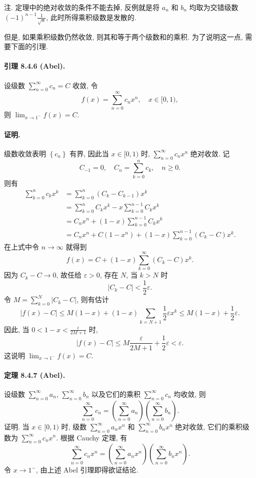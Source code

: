 注. 定理中的绝对收敛的条件不能去掉, 反例就是将 $a_{n}$ 和 $b_{n}$ 均取为交错级数 $(-1)^{n-1}\frac{1}{\sqrt{n}}$,
此时所得乘积级数是发散的. 

但是, 如果乘积级数仍然收敛, 则其和等于两个级数和的乘积. 为了说明这一点, 需要下面的引理.

\paragraph{引理 8.4.6 (Abel). }

设级数 $\sum_{n=0}^{\infty}c_{n}=C$ 收敛, 令 
\[
f(x)=\sum_{n=0}^{\infty}c_{n}x^{n},\quad x\in[0,1),
\]
则 $\lim_{x\rightarrow1^{-}}f(x)=C$.

\paragraph{证明. }

级数收敛表明 $\left\{ c_{n}\right\} $ 有界, 因此当 $x\in[0,1)$ 时, $\sum_{n=0}^{\infty}c_{n}x^{n}$
绝对收敛. 记 
\[
C_{-1}=0,\quad C_{n}=\sum_{k=0}^{n}c_{k},\quad n\geqslant0.
\]
则有 
\[
\begin{aligned}\sum_{k=0}^{n}c_{k}x^{k} & =\sum_{k=0}^{n}\left(C_{k}-C_{k-1}\right)x^{k}\\
	& =\sum_{k=0}^{n}C_{k}x^{k}-x\sum_{k=0}^{n-1}C_{k}x^{k}\\
	& =C_{n}x^{n}+(1-x)\sum_{k=0}^{n-1}C_{k}x^{k}\\
	& =C_{n}x^{n}+C\left(1-x^{n}\right)+(1-x)\sum_{k=0}^{n-1}\left(C_{k}-C\right)x^{k}.
\end{aligned}
\]
在上式中令 $n\rightarrow\infty$ 就得到 
\[
f(x)=C+(1-x)\sum_{k=0}^{\infty}\left(C_{k}-C\right)x^{k}.
\]
因为 $C_{k}-C\rightarrow0$, 故任给 $\varepsilon>0$, 存在 $N$, 当 $k>N$
时 
\[
\left|C_{k}-C\right|<\frac{1}{2}\varepsilon.
\]
令 $M=\sum_{k=0}^{N}\left|C_{k}-C\right|$, 则有估计 
\[
|f(x)-C|\leqslant M(1-x)+(1-x)\sum_{k=N+1}\frac{1}{2}\varepsilon x^{k}\leqslant M(1-x)+\frac{1}{2}\varepsilon.
\]
因此, 当 $0<1-x<\frac{\varepsilon}{2M+1}$ 时, 
\[
|f(x)-C|\leqslant M\frac{\varepsilon}{2M+1}+\frac{1}{2}\varepsilon<\varepsilon.
\]
这说明 $\lim_{x\rightarrow1^{-}}f(x)=C$.

\paragraph{定理 8.4.7 (Abel). }

设级数 $\sum_{n=0}^{\infty}a_{n}$, $\sum_{n=0}^{\infty}b_{n}$ 以及它们的乘积
$\sum_{n=0}^{\infty}c_{n}$ 均收敛, 则 
\[
\sum_{n=0}^{\infty}c_{n}=\left(\sum_{n=0}^{\infty}a_{n}\right)\left(\sum_{n=0}^{\infty}b_{n}\right).
\]
证明. 当 $x\in[0,1)$ 时, 级数 $\sum_{n=0}^{\infty}a_{n}x^{n}$ 和 $\sum_{n=0}^{\infty}b_{n}x^{n}$
绝对收敛, 它们的乘积级数为 $\sum_{n=0}^{\infty}c_{n}x^{n}$. 根据 Cauchy 定理, 有 
\[
\sum_{n=0}^{\infty}c_{n}x^{n}=\left(\sum_{n=0}^{\infty}a_{n}x^{n}\right)\left(\sum_{n=0}^{\infty}b_{n}x^{n}\right).
\]
令 $x\rightarrow1^{-}$, 由上述 Abel 引理即得欲证结论.

